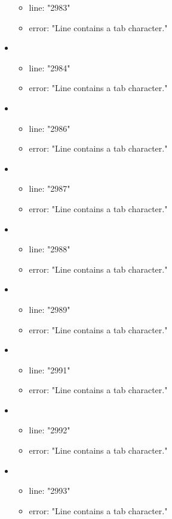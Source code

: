 \begin{itemize}
\begin{itemize}
		\item line: "2983" 
		\item error: "Line contains a tab character." 
	\end{itemize}
	\item 
	\begin{itemize} 
		\item line: "2984" 
		\item error: "Line contains a tab character." 
	\end{itemize}
	\item 
	\begin{itemize} 
		\item line: "2986" 
		\item error: "Line contains a tab character." 
	\end{itemize}
	\item 
	\begin{itemize} 
		\item line: "2987" 
		\item error: "Line contains a tab character." 
	\end{itemize}
	\item 
	\begin{itemize} 
		\item line: "2988" 
		\item error: "Line contains a tab character." 
	\end{itemize}
	\item 
	\begin{itemize} 
		\item line: "2989" 
		\item error: "Line contains a tab character." 
	\end{itemize}
	\item 
	\begin{itemize} 
		\item line: "2991" 
		\item error: "Line contains a tab character." 
	\end{itemize}
	\item 
	\begin{itemize} 
		\item line: "2992" 
		\item error: "Line contains a tab character." 
	\end{itemize}
	\item 
	\begin{itemize} 
		\item line: "2993" 
		\item error: "Line contains a tab character." 

\end{itemize}
\end{itemize}
